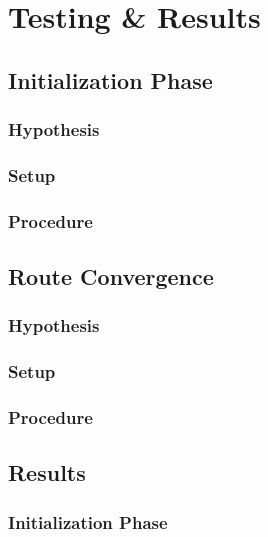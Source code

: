 \chapter{Testing \& Results}
\label{ch:testing_results}
\acresetall


\section{Initialization Phase}

\subsection{Hypothesis}

\subsection{Setup}

\subsection{Procedure}



\section{Route Convergence}

\subsection{Hypothesis}

\subsection{Setup}

\subsection{Procedure}



\section{Results}

\subsection{Initialization Phase}

